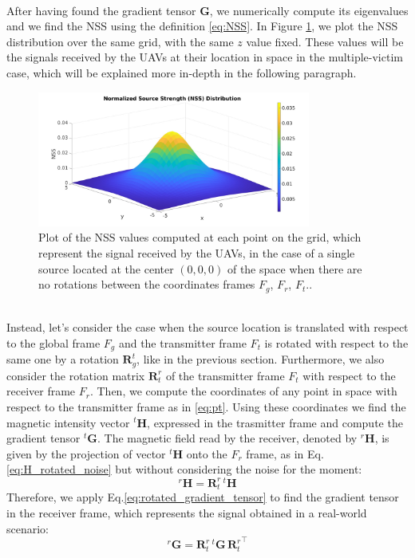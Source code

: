 \documentclass[main]{subfiles}
\begin{document}
\noindent\\
After having found the gradient tensor $\mathbf{G}$, we numerically
compute its eigenvalues and we find the NSS using the definition \eqref{eq:NSS}.
In Figure \ref{fig:NSS_single_anal}, we plot the NSS distribution over the same grid,
with the same $z$ value fixed.
These values will be the signals received by the UAVs at their location
in space in the multiple-victim case, which will be explained more in-depth in the following paragraph.
\begin{figure}
\centering
\includegraphics[width=0.8\textwidth]{images/NSS_single_anal.jpg}
\caption{Plot of the NSS values computed at each point on the grid, which
represent the signal received by the UAVs, in the case of a single source located
at the center $(0,0,0)$ of the space when there are no rotations between the coordinates
frames $F_g$, $F_r$, $F_t$..}
\label{fig:NSS_single_anal}
\end{figure}

\noindent\\
Instead, let's consider the case when the source location is translated
with respect to the global frame $F_g$ and the transmitter frame $F_t$ is rotated
with respect to the same one by a rotation $\mathbf{R}_g^t$, like in the previous 
section.
Furthermore, we also consider the rotation matrix $\mathbf{R}^r_t$ of the transmitter frame $F_t$ 
with respect to the receiver frame $F_r$.
Then, we compute the coordinates of any point in space with respect to the
transmitter frame as in \ref{eq:pt}.
Using these coordinates we find the magnetic intensity vector ${}^t\mathbf{H}$,
expressed in the trasmitter frame and compute the gradient tensor ${}^t \mathbf{G}$.
The magnetic field read by the receiver, denoted by ${}^r\mathbf{H}$, is given by the projection
of vector ${}^t\mathbf{H}$ onto the $F_r$ frame, as in Eq.\ref{eq:H_rotated_noise} but without considering
the noise for the moment:
\begin{equation}
    {}^r\mathbf{H} = \mathbf{R}^r_t \, {}^t\mathbf{H}
    \label{eq:H_receiver}
\end{equation}
Therefore, we apply Eq.\ref{eq:rotated_gradient_tensor} to find the gradient tensor
in the receiver frame, which represents the signal obtained in a real-world scenario:
\begin{equation}
    {}^r \mathbf{G} = \mathbf{R}^r_t \, {}^t\mathbf{G} \, {\mathbf{R}^r_t}^\top
    \label{eq:G_rotated}
\end{equation}
\end{document}
